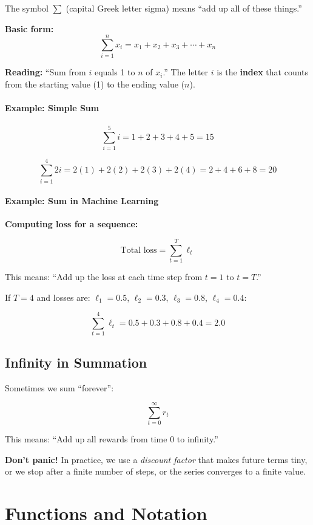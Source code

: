 \begin{chapterenv}
The symbol $\sum$ (capital Greek letter sigma) means ``add up all of these things.''

\textbf{Basic form:}
\[\sum_{i=1}^{n} x_i = x_1 + x_2 + x_3 + \cdots + x_n\]

\textbf{Reading:} ``Sum from $i$ equals 1 to $n$ of $x_i$.'' The letter $i$ is the \textbf{index} that counts from the starting value (1) to the ending value ($n$).

\paragraph{Example: Simple Sum}

\[\sum_{i=1}^{5} i = 1 + 2 + 3 + 4 + 5 = 15\]

\[\sum_{i=1}^{4} 2i = 2(1) + 2(2) + 2(3) + 2(4) = 2 + 4 + 6 + 8 = 20\]

\paragraph{Example: Sum in Machine Learning}

\textbf{Computing loss for a sequence:}

\[\text{Total loss} = \sum_{t=1}^{T} \ell_t\]

This means: ``Add up the loss at each time step from $t=1$ to $t=T$.''

If $T=4$ and losses are: $\ell_1 = 0.5$, $\ell_2 = 0.3$, $\ell_3 = 0.8$, $\ell_4 = 0.4$:

\[\sum_{t=1}^{4} \ell_t = 0.5 + 0.3 + 0.8 + 0.4 = 2.0\]

\subsection{Infinity in Summation}

Sometimes we sum ``forever'':

\[\sum_{t=0}^{\infty} r_t\]

This means: ``Add up all rewards from time 0 to infinity.''

\begin{infobox}
\textbf{Don't panic!} In practice, we use a \textit{discount factor} that makes future terms tiny, or we stop after a finite number of steps, or the series converges to a finite value.
\end{infobox}

\section{Functions and Notation}


\end{chapterenv}
